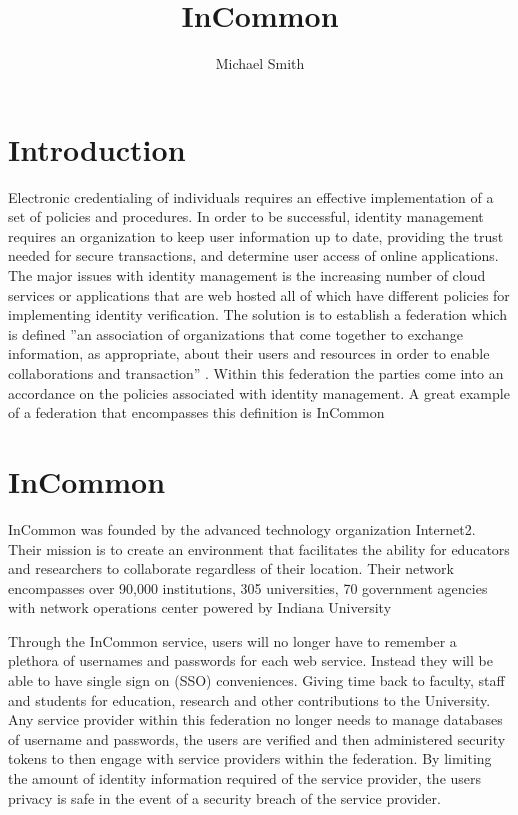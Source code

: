 \documentclass[9pt,twocolumn,twoside]{../../styles/osajnl}
\title{InCommon}
\author[1]{Michael Smith}
\affil[1]{School of Informatics and Computing, Bloomington, IN 47408, U.S.A.}
\affil[*]{Corresponding authors: mls35@iu.edu}
\begin{document}
\maketitle

\section{Introduction}

Electronic credentialing of individuals requires an effective
implementation of a set of policies and procedures.  In order to be
successful, identity management requires an organization to keep user
information up to date, providing the trust needed for secure
transactions, and determine user access of online applications.  The
major issues with identity management is the increasing number of
cloud services or applications that are web hosted all of which have
different policies for implementing identity verification.  The
solution is to establish a federation which is defined ''an association
of organizations that come together to exchange information, as
appropriate, about their users and resources in order to enable
collaborations and transaction'' \cite{www-incommonppt}.
Within this federation the parties come into an accordance on the
policies associated with identity management.  A great example of a
federation that encompasses this definition is InCommon

\section{InCommon}

InCommon was founded by the advanced technology organization
Internet2.  Their mission is to create an environment that facilitates
the ability for educators and researchers to collaborate regardless of
their location.  Their network encompasses over 90,000 institutions,
305 universities, 70 government agencies with network operations
center powered by Indiana University \cite{www-internet2}

Through the InCommon service, users will no longer have to remember a
plethora of usernames and passwords for each web service.  Instead
they will be able to have single sign on (SSO) conveniences.  Giving
time back to faculty, staff and students for education, research and
other contributions to the University.  Any service provider within
this federation no longer needs to manage databases of username and
passwords, the users are verified and then administered security
tokens to then engage with service providers within the federation.
By limiting the amount of identity information required of the service
provider, the users privacy is safe in the event of a security breach
of the service provider.
\end{document}

